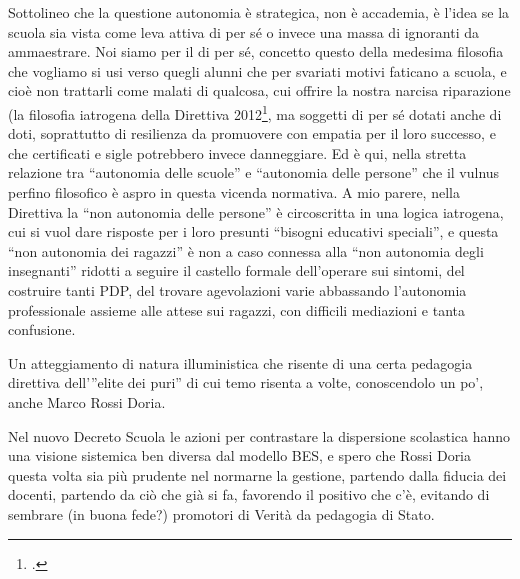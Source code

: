 Sottolineo che la questione autonomia è strategica, non è accademia, è l'idea se la scuola sia vista come leva attiva di per sé o invece una  massa di ignoranti da  ammaestrare.  Noi siamo per il di per sé, concetto questo della medesima filosofia che vogliamo si usi verso quegli alunni che per svariati motivi faticano a scuola, e cioè non trattarli come malati di qualcosa,  cui offrire la nostra narcisa  riparazione (la filosofia iatrogena della Direttiva 2012\footcite{dir27Dic2012}, ma soggetti  di per sé dotati anche di doti, soprattutto di resilienza da promuovere con empatia per il loro successo, e che certificati e sigle potrebbero invece danneggiare.  Ed è qui, nella stretta relazione tra “autonomia delle scuole” e “autonomia delle persone” che il vulnus perfino filosofico è aspro in questa vicenda normativa. A mio parere, nella Direttiva  la “non autonomia delle persone”  è circoscritta in una logica iatrogena, cui si vuol dare risposte per i loro presunti “bisogni educativi speciali”, e questa “non autonomia dei ragazzi” è non a caso connessa alla “non autonomia degli insegnanti” ridotti a seguire il castello formale dell'operare sui sintomi, del costruire tanti PDP, del trovare agevolazioni varie abbassando l'autonomia professionale assieme alle attese sui ragazzi, con difficili mediazioni e tanta confusione.

Un atteggiamento di natura illuministica che risente di una certa pedagogia direttiva dell’”elite dei puri” di cui temo risenta  a volte, conoscendolo un po’,  anche Marco Rossi Doria. 

Nel  nuovo Decreto Scuola le azioni per contrastare la dispersione scolastica hanno una visione sistemica ben diversa dal modello BES, e spero che  Rossi Doria  questa volta sia più prudente nel normarne  la gestione, partendo dalla fiducia dei docenti, partendo da ciò che già si fa, favorendo il positivo che c'è, evitando di sembrare (in buona fede?) promotori di Verità da pedagogia di Stato.
